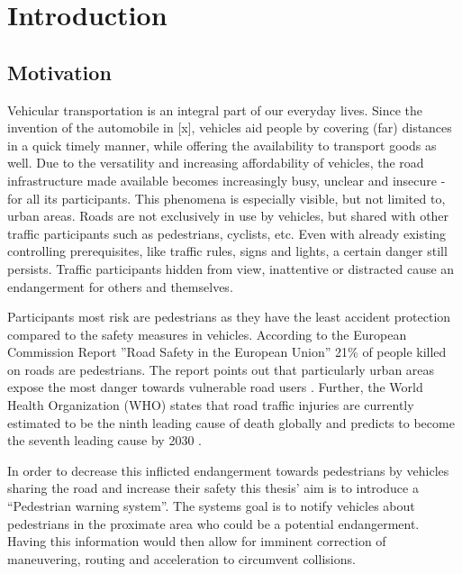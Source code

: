 \chapter{Introduction}
\label{cha:Introduction}

\section{Motivation}
Vehicular transportation is an integral part of our everyday lives. Since the invention of the automobile in [x], vehicles aid people by covering (far) distances in a quick timely manner, while offering the availability to transport goods as well. Due to the versatility and increasing affordability of vehicles, the road infrastructure made available becomes increasingly busy, unclear and insecure - for all its participants. This phenomena is especially visible, but not limited to, urban areas. Roads are not exclusively in use by vehicles, but shared with other traffic participants such as pedestrians, cyclists, etc. Even with already existing controlling prerequisites, like traffic rules, signs and lights, a certain danger still persists. Traffic participants hidden from view, inattentive or distracted cause an endangerment for others and themselves. 

Participants most risk are pedestrians
as they have the least accident protection compared to the safety measures in vehicles.
According to the European Commission Report ''Road Safety in the European Union'' 21\% of people killed on roads are pedestrians. The report points out that particularly urban areas expose the most danger towards vulnerable road users \cite{EURoadSafetyReport2017}.
Further, the World Health Organization (WHO) states that road traffic injuries are currently estimated to be the ninth leading cause of death globally and predicts to become the seventh leading cause by 2030 \cite{WHOGlobalReportRoadSafety}.

In order to decrease this inflicted endangerment towards pedestrians by vehicles sharing the road and increase their safety this thesis' aim is to introduce a ``Pedestrian warning system''. The systems goal is to notify vehicles about pedestrians in the proximate area who could be a potential endangerment. Having this information would then allow for imminent correction of maneuvering, routing and acceleration to circumvent collisions.

